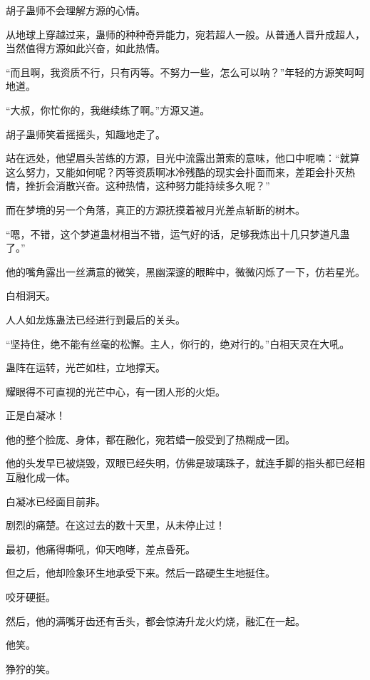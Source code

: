
\begin{this_body}



胡子蛊师不会理解方源的心情。

从地球上穿越过来，蛊师的种种奇异能力，宛若超人一般。从普通人晋升成超人，当然值得方源如此兴奋，如此热情。

“而且啊，我资质不行，只有丙等。不努力一些，怎么可以呐？”年轻的方源笑呵呵地道。

“大叔，你忙你的，我继续练了啊。”方源又道。

胡子蛊师笑着摇摇头，知趣地走了。

站在远处，他望眉头苦练的方源，目光中流露出萧索的意味，他口中呢喃：“就算这么努力，又能如何呢？丙等资质啊冰冷残酷的现实会扑面而来，差距会扑灭热情，挫折会消散兴奋。这种热情，这种努力能持续多久呢？”

而在梦境的另一个角落，真正的方源抚摸着被月光差点斩断的树木。

“嗯，不错，这个梦道蛊材相当不错，运气好的话，足够我炼出十几只梦道凡蛊了。”

他的嘴角露出一丝满意的微笑，黑幽深邃的眼眸中，微微闪烁了一下，仿若星光。

白相洞天。

人人如龙炼蛊法已经进行到最后的关头。

“坚持住，绝不能有丝毫的松懈。主人，你行的，绝对行的。”白相天灵在大吼。

蛊阵在运转，光芒如柱，立地撑天。

耀眼得不可直视的光芒中心，有一团人形的火炬。

正是白凝冰！

他的整个脸庞、身体，都在融化，宛若蜡一般受到了热糊成一团。

他的头发早已被烧毁，双眼已经失明，仿佛是玻璃珠子，就连手脚的指头都已经相互融化成一体。

白凝冰已经面目前非。

剧烈的痛楚。在这过去的数十天里，从未停止过！

最初，他痛得嘶吼，仰天咆哮，差点昏死。

但之后，他却险象环生地承受下来。然后一路硬生生地挺住。

咬牙硬挺。

然后，他的满嘴牙齿还有舌头，都会惊涛升龙火灼烧，融汇在一起。

他笑。

狰狞的笑。


\end{this_body}
